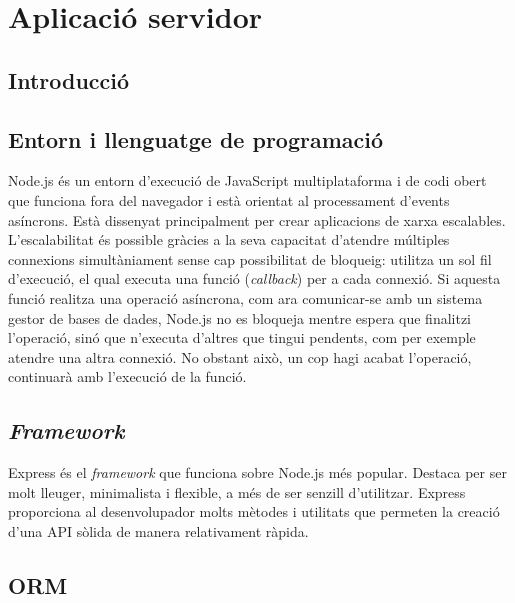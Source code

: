 \documentclass[a4paper,12pt]{ThesisStyle}
\begin{document}
\section{Aplicació servidor}
\label{sec:decisions_servidor}

\subsection{Introducció}
\label{subsec:decisions_servidor_intro}



\subsection{Entorn i llenguatge de programació}
\label{subsec:decisions_servidor_entorn}

Node.js és un entorn d'execució de JavaScript multiplataforma i de codi obert que funciona fora del navegador i està orientat al processament d'events asíncrons. Està dissenyat principalment per crear aplicacions de xarxa escalables. L'escalabilitat és possible gràcies a la seva capacitat d'atendre múltiples connexions simultàniament sense cap possibilitat de bloqueig: utilitza un sol fil d'execució, el qual executa una funció (\textit{callback}) per a cada connexió. Si aquesta funció realitza una operació asíncrona, com ara comunicar-se amb un sistema gestor de bases de dades, Node.js no es bloqueja mentre espera que finalitzi l'operació, sinó que n'executa d'altres que tingui pendents, com per exemple atendre una altra connexió. No obstant això, un cop hagi acabat l'operació, continuarà amb l'execució de la funció.

\subsection{\textit{Framework}}
\label{subsec:decisions_servidor_framework}

Express és el \textit{framework} que funciona sobre Node.js més popular. Destaca per ser molt lleuger, minimalista i flexible, a més de ser senzill d'utilitzar. Express proporciona al desenvolupador molts mètodes i utilitats que permeten la creació d'una API sòlida de manera relativament ràpida.

\subsection{ORM}
\label{subsec:decisions_servidor_orm}
\end{document}
